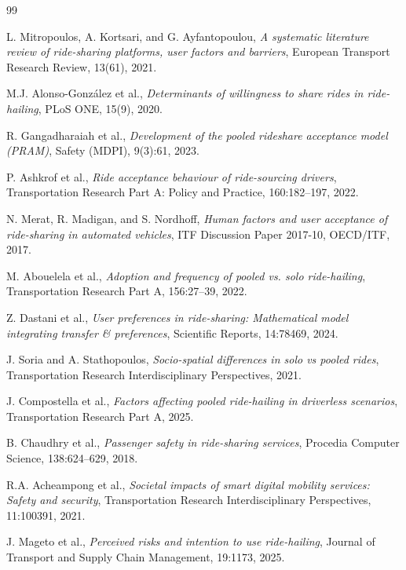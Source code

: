 \clearpage
\renewcommand{\bibname}{References}

\begin{thebibliography}{99}

L. Mitropoulos, A. Kortsari, and G. Ayfantopoulou,
\textit{A systematic literature review of ride-sharing platforms, user factors and barriers},
European Transport Research Review, 13(61), 2021.

M.J. Alonso-González et al.,
\textit{Determinants of willingness to share rides in ride-hailing},
PLoS ONE, 15(9), 2020.

R. Gangadharaiah et al.,
\textit{Development of the pooled rideshare acceptance model (PRAM)},
Safety (MDPI), 9(3):61, 2023.

P. Ashkrof et al.,
\textit{Ride acceptance behaviour of ride-sourcing drivers},
Transportation Research Part A: Policy and Practice, 160:182–197, 2022.

N. Merat, R. Madigan, and S. Nordhoff,
\textit{Human factors and user acceptance of ride-sharing in automated vehicles},
ITF Discussion Paper 2017-10, OECD/ITF, 2017.

M. Abouelela et al.,
\textit{Adoption and frequency of pooled vs. solo ride-hailing},
Transportation Research Part A, 156:27–39, 2022.

Z. Dastani et al.,
\textit{User preferences in ride-sharing: Mathematical model integrating transfer & preferences},
Scientific Reports, 14:78469, 2024.

J. Soria and A. Stathopoulos,
\textit{Socio-spatial differences in solo vs pooled rides},
Transportation Research Interdisciplinary Perspectives, 2021.

J. Compostella et al.,
\textit{Factors affecting pooled ride-hailing in driverless scenarios},
Transportation Research Part A, 2025.

B. Chaudhry et al.,
\textit{Passenger safety in ride-sharing services},
Procedia Computer Science, 138:624–629, 2018.

R.A. Acheampong et al.,
\textit{Societal impacts of smart digital mobility services: Safety and security},
Transportation Research Interdisciplinary Perspectives, 11:100391, 2021.

J. Mageto et al.,
\textit{Perceived risks and intention to use ride-hailing},
Journal of Transport and Supply Chain Management, 19:1173, 2025.


\end{thebibliography}

